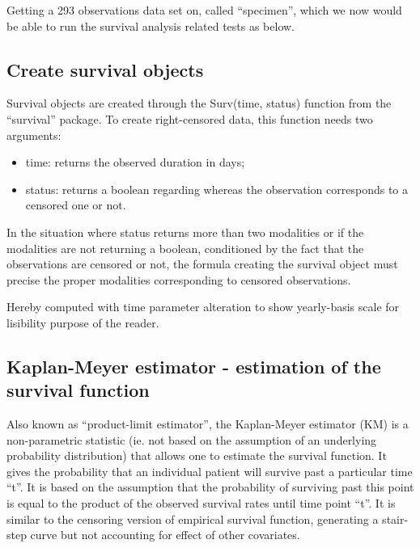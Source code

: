 \documentclass[]{article}
\newenvironment{Shaded}{\begin{snugshade}}{\end{snugshade}}
\newcommand{\KeywordTok}[1]{\textcolor[rgb]{0.13,0.29,0.53}{\textbf{#1}}}
\newcommand{\FloatTok}[1]{\textcolor[rgb]{0.00,0.00,0.81}{#1}}
\newcommand{\StringTok}[1]{\textcolor[rgb]{0.31,0.60,0.02}{#1}}
\newcommand{\OperatorTok}[1]{\textcolor[rgb]{0.81,0.36,0.00}{\textbf{#1}}}
\newcommand{\NormalTok}[1]{#1}
\providecommand{\tightlist}{%
  \setlength{\itemsep}{0pt}\setlength{\parskip}{0pt}}
\begin{document}
Getting a 293 observations data set on, called ``specimen'', which we
now would be able to run the survival analysis related tests as below.

\subsection{Create survival objects}\label{create-survival-objects}

Survival objects are created through the Surv(time, status) function
from the ``survival'' package. To create right-censored data, this
function needs two arguments:

\begin{itemize}
\tightlist
\item
  time: returns the observed duration in days;
\item
  status: returns a boolean regarding whereas the observation
  corresponds to a censored one or not.
\end{itemize}

In the situation where status returns more than two modalities or if the
modalities are not returning a boolean, conditioned by the fact that the
observations are censored or not, the formula creating the survival
object must precise the proper modalities corresponding to censored
observations.

\begin{Shaded}
\end{Shaded}

Hereby computed with time parameter alteration to show yearly-basis
scale for lisibility purpose of the reader.

\subsection{Kaplan-Meyer estimator - estimation of the survival
function}\label{kaplan-meyer-estimator---estimation-of-the-survival-function}

Also known as ``product-limit estimator'', the Kaplan-Meyer estimator
(KM) is a non-parametric statistic (ie. not based on the assumption of
an underlying probability distribution) that allows one to estimate the
survival function. It gives the probability that an individual patient
will survive past a particular time ``t''. It is based on the assumption
that the probability of surviving past this point is equal to the
product of the observed survival rates until time point ``t''. It is
similar to the censoring version of empirical survival function,
generating a stair-step curve but not accounting for effect of other
covariates.
\end{document}
